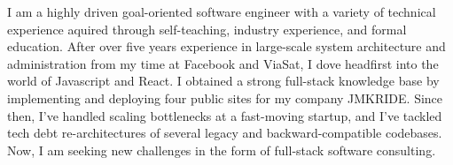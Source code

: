 

\begin{cvparagraph}

I am a highly driven goal-oriented software engineer with a variety of technical
experience aquired through self-teaching, industry experience, and formal
education.  After over five years experience in large-scale system
architecture and administration from my time at Facebook and ViaSat, I dove
headfirst into the world of Javascript and React. I obtained a strong full-stack
knowledge base by implementing and deploying four public sites for my
company JMKRIDE. Since then, I've handled scaling bottlenecks at a fast-moving
startup, and I've tackled tech debt re-architectures of several legacy and
backward-compatible codebases. Now, I am seeking new challenges in the form of
full-stack software consulting.

\end{cvparagraph}
